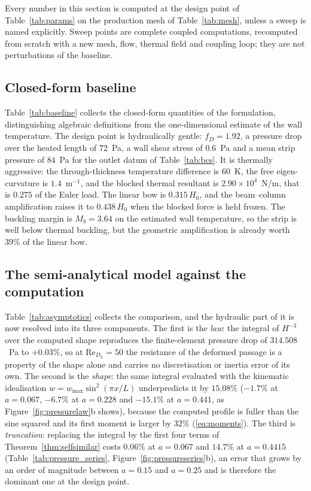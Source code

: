 \documentclass[11pt,a4paper]{article}
\newcommand{\tabinput}[1]{%
  \IfFileExists{tables/#1}{}{}}
\newcommand{\ReDh}{\mathrm{Re}_{D_h}}
\begin{document}
Every number in this section is computed at the design point of
Table~\ref{tab:params} on the production mesh of Table~\ref{tab:mesh}, unless
a sweep is named explicitly. Sweep points are complete coupled computations,
recomputed from scratch with a new mesh, flow, thermal field and coupling
loop; they are not perturbations of the baseline.

\subsection{Closed-form baseline}
\label{sec:baseline}

Table~\ref{tab:baseline} collects the closed-form quantities of the
formulation, distinguishing algebraic definitions from the one-dimensional
estimate of the wall temperature. The design point is hydraulically gentle:
$f_D=1.92$, a pressure drop over the heated length of $72$~Pa, a wall shear
stress of $0.6$~Pa and a mean strip pressure of $84$~Pa for the outlet datum
of Table~\ref{tab:bcs}. It is thermally aggressive: the through-thickness
temperature difference is $60$~K, the free eigen-curvature is
$1.4$~m$^{-1}$, and the blocked thermal resultant is
$2.90\times10^{4}$~N/m, that is $0.275$ of the Euler load. The linear bow is
$0.315\,H_0$, and the beam--column amplification raises it to $0.438\,H_0$
when the blocked force is held frozen. The buckling margin is $M_b=3.64$ on
the estimated wall temperature, so the strip is well below thermal buckling,
but the geometric amplification is already worth $39\%$ of the linear bow.

\tabinput{table_baseline.tex}

\subsection{The semi-analytical model against the computation}
\label{sec:asymptotics}

Table~\ref{tab:asymptotics} collects the comparison, and the hydraulic part of it is now
resolved into its three components. The first is the \emph{law}: the integral of $H^{-3}$ over
the computed shape reproduces the finite-element pressure drop of $314.508$~Pa to $+0.03\%$,
so at $\ReDh=50$ the resistance of the deformed passage is a property of the shape alone and
carries no discretisation or inertia error of its own. The second is the \emph{shape}: the same
integral evaluated with the kinematic idealisation $w=w_{\max}\sin^2(\pi x/L)$ underpredicts it
by $15.08\%$ ($-1.7\%$ at $a=0.067$, $-6.7\%$ at $a=0.228$ and $-15.1\%$ at $a=0.441$, as
Figure~\ref{fig:pressurelaw}b shows), because the computed profile is fuller than the sine
squared and its first moment is larger by $32\%$ (\eqref{eq:moments}). The third is
\emph{truncation}: replacing the integral by the first four terms of
Theorem~\ref{thm:selfsimilar} costs $0.06\%$ at $a=0.067$ and $14.7\%$ at $a=0.4415$
(Table~\ref{tab:pressure_series}, Figure~\ref{fig:pressureseries}b), an error that grows by an
order of magnitude between $a=0.15$ and $a=0.25$ and is therefore the dominant one at the
design point.
\end{document}

